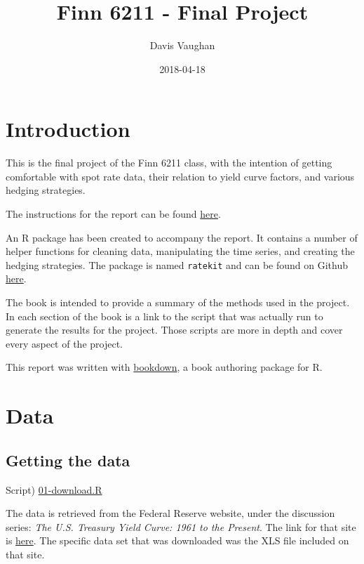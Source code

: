\documentclass[]{book}
\title{Finn 6211 - Final Project}
\author{Davis Vaughan}
\date{2018-04-18}
\theoremstyle{definition}
\theoremstyle{definition}
\theoremstyle{definition}
\theoremstyle{remark}
\begin{document}
\maketitle

{
\setcounter{tocdepth}{1}
\tableofcontents
}
\hypertarget{titlepage}{%
\chapter{Introduction}\label{titlepage}}

This is the final project of the Finn 6211 class, with the intention of
getting comfortable with spot rate data, their relation to yield curve
factors, and various hedging strategies.

The instructions for the report can be found
\href{./instructions/Hedging_Project_S18.pdf}{here}.

An R package has been created to accompany the report. It contains a
number of helper functions for cleaning data, manipulating the time
series, and creating the hedging strategies. The package is named
\texttt{ratekit} and can be found on Github
\href{https://github.com/DavisVaughan/ratekit}{here}.

The book is intended to provide a summary of the methods used in the
project. In each section of the book is a link to the script that was
actually run to generate the results for the project. Those scripts are
more in depth and cover every aspect of the project.

This report was written with
\href{https://bookdown.org/yihui/bookdown/}{bookdown}, a book authoring
package for R.

\hypertarget{data}{%
\chapter{Data}\label{data}}

\hypertarget{retrieve}{%
\section{Getting the data}\label{retrieve}}

Script) \href{./R/01-download.R}{01-download.R}

The data is retrieved from the Federal Reserve website, under the
discussion series: \emph{The U.S. Treasury Yield Curve: 1961 to the
Present}. The link for that site is
\href{https://www.federalreserve.gov/pubs/feds/2006/200628/200628abs.html}{here}.
The specific data set that was downloaded was the XLS file included on
that site.
\end{document}
